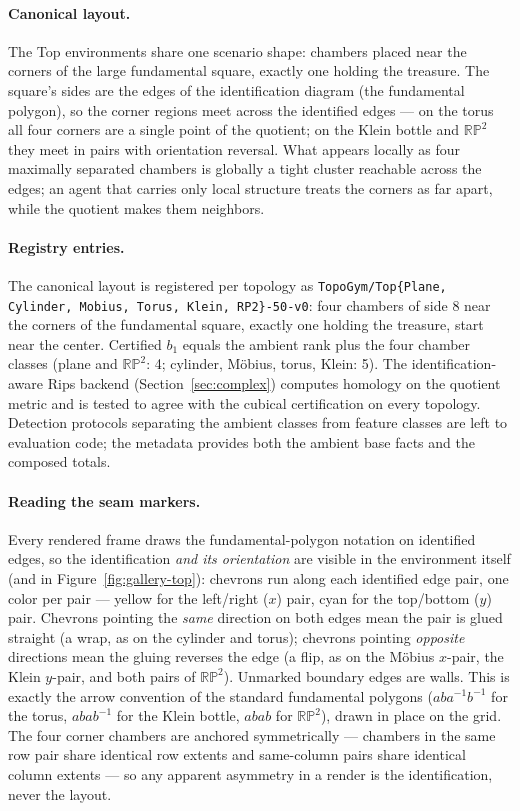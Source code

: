 \documentclass[11pt]{article}
\begin{document}
\paragraph{Canonical layout.} The Top environments share one
scenario shape: chambers placed near the corners of the large
fundamental square, exactly one holding the treasure. The square's
sides are the edges of the identification diagram (the fundamental
polygon), so the corner regions meet across the identified edges ---
on the torus all four corners are a single point of the quotient; on
the Klein bottle and \(\mathbb{RP}^2\) they meet in pairs with
orientation reversal. What appears locally as four maximally
separated chambers is globally a tight cluster reachable across the
edges; an agent that carries only local structure treats the corners
as far apart, while the quotient makes them neighbors.

\paragraph{Registry entries.} The canonical layout is registered per
topology as \texttt{TopoGym/Top\{Plane, Cylinder, Mobius, Torus,
Klein, RP2\}-50-v0}: four chambers of side 8 near the corners of the
fundamental square, exactly one holding the treasure, start near the
center. Certified $b_1$ equals the ambient rank plus the four chamber
classes (plane and $\mathbb{RP}^2$: 4; cylinder, M\"obius, torus,
Klein: 5). The identification-aware Rips backend
(Section~\ref{sec:complex}) computes homology on the quotient metric
and is tested to agree with the cubical certification on every
topology. Detection protocols separating the ambient classes from
feature classes are left to evaluation code; the metadata provides
both the ambient base facts and the composed totals.

\paragraph{Reading the seam markers.} Every rendered frame draws the
fundamental-polygon notation on identified edges, so the
identification \emph{and its orientation} are visible in the
environment itself (and in Figure~\ref{fig:gallery-top}): chevrons
run along each identified edge pair, one color per pair --- yellow
for the left/right ($x$) pair, cyan for the top/bottom ($y$) pair.
Chevrons pointing the \emph{same} direction on both edges mean the
pair is glued straight (a wrap, as on the cylinder and torus);
chevrons pointing \emph{opposite} directions mean the gluing
reverses the edge (a flip, as on the M\"obius $x$-pair, the Klein
$y$-pair, and both pairs of $\mathbb{RP}^2$). Unmarked boundary
edges are walls. This is exactly the arrow convention of the standard
fundamental polygons ($aba^{-1}b^{-1}$ for the torus, $abab^{-1}$
for the Klein bottle, $abab$ for $\mathbb{RP}^2$), drawn in place on
the grid. The four corner chambers are anchored symmetrically ---
chambers in the same row pair share identical row extents and
same-column pairs share identical column extents --- so any apparent
asymmetry in a render is the identification, never the layout.
\end{document}

